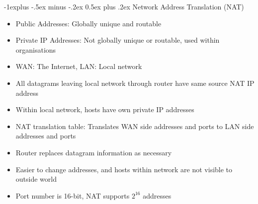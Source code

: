 \documentclass[10pt, landscape]{article}
\makeatletter
\renewcommand{\section}{\@startsection{section}{1}{0mm}%
                                {-1ex plus -.5ex minus -.2ex}%
                                {0.5ex plus .2ex}%
                                {\normalfont\large\bfseries}}
\renewcommand{\section}{\@startsection{section}{2}{0mm}%
                                {-1explus -.5ex minus -.2ex}%
                                {0.5ex plus .2ex}%
                                {\normalfont\normalsize\bfseries}}
\makeatother
\begin{document}
\begin{multicols*}{3}
\section{Network Address Translation (NAT)}
\begin{itemize}
    \item Public Addresses: Globally unique and routable
    \item Private IP Addresses: Not globally unique or routable, used within organisations
    \item WAN: The Internet, LAN: Local network
    \item All datagrams leaving local network through router have same source NAT IP address
    \item Within local network, hosts have own private IP addresses
    \item NAT translation table: Translates WAN side addresses and ports to LAN side addresses and ports
    \item Router replaces datagram information as necessary
    \item Easier to change addresses, and hosts within network are not visible to outside world
    \item Port number is 16-bit, NAT supports $2^{16}$ addresses
\end{itemize}


\end{multicols*}
\end{document}
